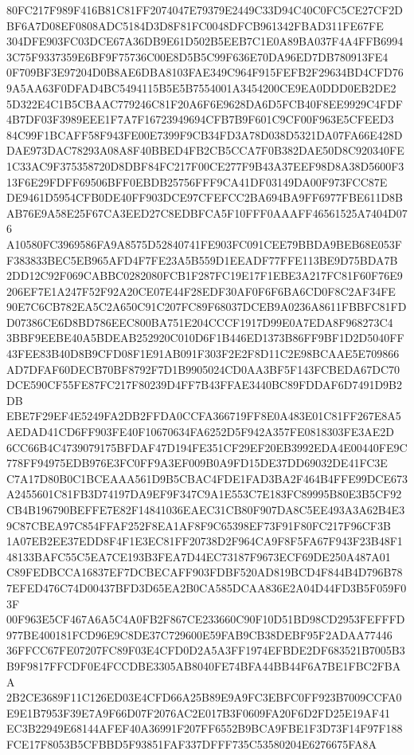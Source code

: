\documentclass[UTF8,fontset=fandol,zihao=-4,a4paper]{ctexart}
\begin{document}
{{80FC217F989F416B81C81FF2074047E79379E2449C33D94C40C0FC5CE27CF2DBF6A7D08EF0808ADC5184D3D8F81FC0048DFCB961342FBAD311FE67FE
304DFE903FC03DCE67A36DB9E61D502B5EEB7C1E0A89BA037F4A4FFB69943C75F9337359E6BF9F75736C00E8D5B5C99F636E70DA96ED7DB780913FE4
0F709BF3E97204D0B8AE6DBA8103FAE349C964F915FEFB2F29634BD4CFD769A5AA63F0DFAD4BC5494115B5E5B7554001A3454200CE9EA0DDD0EB2DE2
5D322E4C1B5CBAAC779246C81F20A6F6E9628DA6D5FCB40F8EE9929C4FDF4B7DF03F3989EEE1F7A7F16723949694CFB7B9F601C9CF00F963E5CFEED3
84C99F1BCAFF58F943FE00E7399F9CB34FD3A78D038D5321DA07FA66E428DDAE973DAC78293A08A8F40BBED4FB2CB5CCA7F0B382DAE50D8C920340FE
1C33AC9F375358720D8DBF84FC217F00CE277F9B43A37EEF98D8A38D5600F313F6E29FDFF69506BFF0EBDB25756FFF9CA41DF03149DA00F973FCC87E
DE9461D5954CFB0DE40FF903DCE97CFEFCC2BA694BA9FF6977FBE611D8BAB76E9A58E25F67CA3EED27C8EDBFCA5F10FFF0AAAFF46561525A7404D076
A10580FC3969586FA9A8575D52840741FE903FC091CEE79BBDA9BEB68E053FF383833BEC5EB965AFD4F7FE23A5B559D1EEADF77FFE113BE9D75BDA7B
2DD12C92F069CABBC0282080FCB1F287FC19E17F1EBE3A217FC81F60F76E9206EF7E1A247F52F92A20CE07E44F28EDF30AF0F6F6BA6CD0F8C2AF34FE
90E7C6CB782EA5C2A650C91C207FC89F68037DCEB9A0236A8611FBBFC81FDD07386CE6D8BD786EEC800BA751E204CCCF1917D99E0A7EDA8F968273C4
3BBF9EEBE40A5BDEAB252920C010D6F1B446ED1373B86FF9BF1D2D5040FF43FEE83B40D8B9CFD08F1E91AB091F303F2E2F8D11C2E98BCAAE5E709866
AD7DFAF60DECB70BF8792F7D1B9905024CD0AA3BF5F143FCBEDA67DC70DCE590CF55FE87FC217F80239D4FF7B43FFAE3440BC89FDDAF6D7491D9B2DB
EBE7F29EF4E5249FA2DB2FFDA0CCFA366719FF8E0A483E01C81FF267E8A5AEDAD41CD6FF903FE40F10670634FA6252D5F942A357FE0818303FE3AE2D
6CC66B4C4739079175BFDAF47D194FE351CF29EF20EB3992EDA4E00440FE9C778FF94975EDB976E3FC0FF9A3EF009B0A9FD15DE37DD69032DE41FC3E
C7A17D80B0C1BCEAAA561D9B5CBAC4FDE1FAD3BA2F464B4FFE99DCE673A2455601C81FB3D74197DA9EF9F347C9A1E553C7E183FC89995B80E3B5CF92
CB4B196790BEFFE7E82F14841036EAEC31CB80F907DA8C5EE493A3A62B4E39C87CBEA97C854FFAF252F8EA1AF8F9C65398EF73F91F80FC217F96CF3B
1A07EB2EE37EDD8F4F1E3EC81FF20738D2F964CA9F8F5FA67F943F23B48F148133BAFC55C5EA7CE193B3FEA7D44EC73187F9673ECF69DE250A487A01
C89FEDBCCA16837EF7DCBECAFF903FDBF520AD819BCD4F844B4D796B787EFED476C74D00437BFD3D65EA2B0CA585DCAA836E2A04D44FD3B5F059F03F
00F963E5CF467A6A5C4A0FB2F867CE233660C90F10D51BD98CD2953FEFFFD977BE400181FCD96E9C8DE37C729600E59FAB9CB38DEBF95F2ADAA77446
36FFCC67FE07207FC89F03E4CFD0D2A5A3FF1974EFBDE2DF683521B7005B3B9F9817FFCDF0E4FCCDBE3305AB8040FE74BFA44BB44F6A7BE1FBC2FBAA
2B2CE3689F11C126ED03E4CFD66A25B89E9A9FC3EBFC0FF923B7009CCFA0E9E1B7953F39E7A9F66D07F2076AC2E017B3F0609FA20F6D2FD25E19AF41
EC3B22949E68144AFEF40A36991F207FF6552B9BCA9FBE1F3D73F14F97F188FCE17F8053B5CFBBD5F93851FAF337DFFF735C53580204E6276675FA8A
}}
\end{document}
